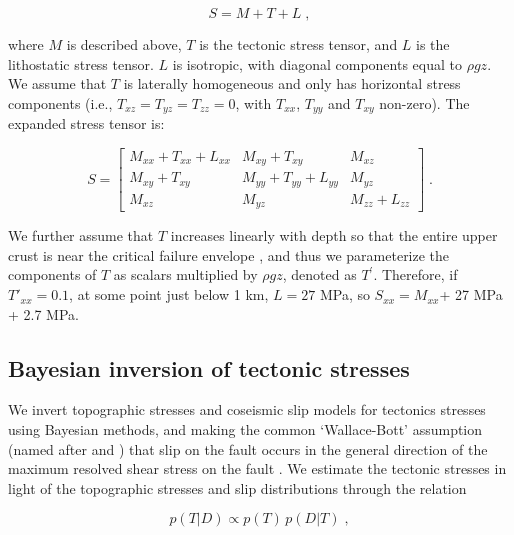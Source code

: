 \documentclass[twocolumn,jgrga]{AGUTeX}
\begin{document}
\begin{article}
\begin{equation}
S = M + T + L \; ,
\end{equation}

where $M$ is described above, $T$ is the tectonic stress tensor, and $L$
is the lithostatic stress tensor. $L$ is isotropic, with diagonal
components equal to $\rho g z$. We assume that $T$ is laterally
homogeneous and only has horizontal stress components (i.e.,
$T_{xz} = T_{yz} = T_{zz} = 0$, with $T_{xx}$, $T_{yy}$ and $T_{xy}$
non-zero). The expanded stress tensor is:

\begin{equation}
S = \begin{bmatrix}
  M_{xx} + T_{xx} + L_{xx} & M_{xy} + T_{xy} &  M_{xz} \\
	M_{xy} + T_{xy} &  M_{yy} + T_{yy} + L_{yy} & M_{yz} \\
	M_{xz}     &  M_{yz}  &  M_{zz} + L_{zz}
	\end{bmatrix} \; .
\label{eqn:stress_tensor}
\end{equation}

We further assume that $T$ increases linearly with depth so
that the entire upper crust is near the critical failure envelope
\citep[e.g.,][]{townend2000}, and thus we parameterize the components of $T$
as scalars multiplied by $\rho g z$, denoted as $T^\prime$. Therefore, if
$T\prime_{xx} = 0.1$, at some point just below 1 km, $L=27$ MPa, so
$S_{xx} = M_{xx}$+ 27 MPa + 2.7 MPa.



\subsection{Bayesian inversion of tectonic
stresses}\label{bayesian-inversion-of-tectonic-stresses}

We invert topographic stresses and coseismic slip models for tectonics
stresses using Bayesian methods, and making the common `Wallace-Bott'
assumption (named after \citet{wallace1951} and \citet{bott1959}) 
that slip on the fault occurs in the general direction
of the maximum resolved shear stress on the fault \citep[e.g.,][]
{mckenzie1969, angelier1994}. We estimate the tectonic stresses in
light of the topographic stresses and slip distributions through the
relation

\begin{equation} 
p(T|D) \propto p(T) \, p(D|T) \; , 
\label{eqn:bayes_rule} 
\end{equation}


\end{article}
\end{document}
